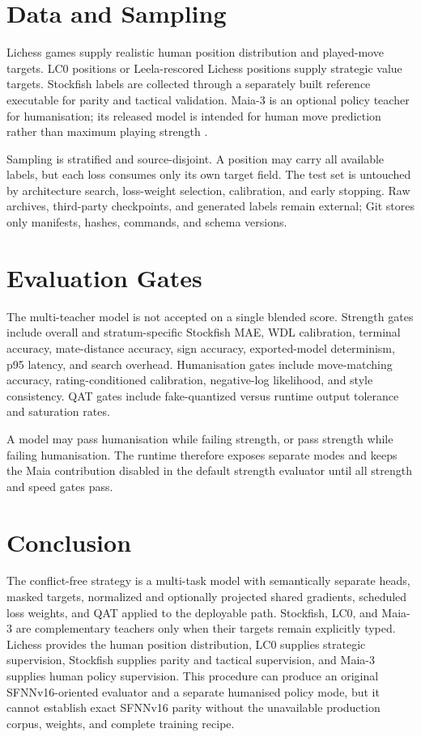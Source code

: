 \documentclass[conference]{IEEEtran}
\begin{document}
\section{Data and Sampling}
Lichess games supply realistic human position distribution and played-move targets. LC0 positions or Leela-rescored Lichess positions supply strategic value targets. Stockfish labels are collected through a separately built reference executable for parity and tactical validation. Maia-3 is an optional policy teacher for humanisation; its released model is intended for human move prediction rather than maximum playing strength \cite{maia3}.

Sampling is stratified and source-disjoint. A position may carry all available labels, but each loss consumes only its own target field. The test set is untouched by architecture search, loss-weight selection, calibration, and early stopping. Raw archives, third-party checkpoints, and generated labels remain external; Git stores only manifests, hashes, commands, and schema versions.

\section{Evaluation Gates}
The multi-teacher model is not accepted on a single blended score. Strength gates include overall and stratum-specific Stockfish MAE, WDL calibration, terminal accuracy, mate-distance accuracy, sign accuracy, exported-model determinism, p95 latency, and search overhead. Humanisation gates include move-matching accuracy, rating-conditioned calibration, negative-log likelihood, and style consistency. QAT gates include fake-quantized versus runtime output tolerance and saturation rates.

A model may pass humanisation while failing strength, or pass strength while failing humanisation. The runtime therefore exposes separate modes and keeps the Maia contribution disabled in the default strength evaluator until all strength and speed gates pass.

\section{Conclusion}
The conflict-free strategy is a multi-task model with semantically separate heads, masked targets, normalized and optionally projected shared gradients, scheduled loss weights, and QAT applied to the deployable path. Stockfish, LC0, and Maia-3 are complementary teachers only when their targets remain explicitly typed. Lichess provides the human position distribution, LC0 supplies strategic supervision, Stockfish supplies parity and tactical supervision, and Maia-3 supplies human policy supervision. This procedure can produce an original SFNNv16-oriented evaluator and a separate humanised policy mode, but it cannot establish exact SFNNv16 parity without the unavailable production corpus, weights, and complete training recipe.
\end{document}
